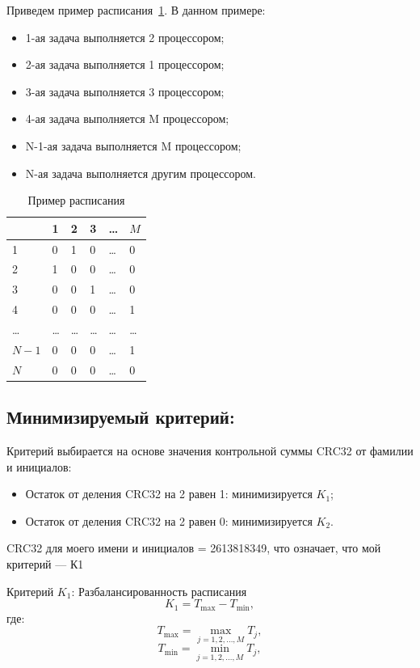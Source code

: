\documentclass[openany, twoside, a4paper, 12pt]{extbook}
\begin{document}
	Приведем пример расписания~\ref{rasp}. 
	В данном примере:
	\begin{itemize}
		\item 1-ая задача выполняется 2 процессором; 
		\item 2-ая задача выполняется 1 процессором;
		\item 3-ая задача выполняется 3 процессором;
		\item 4-ая задача выполняется M процессором;
		\item N-1-ая задача выполняется M процессором;
		\item N-ая задача выполняется другим процессором.
	\end{itemize}
	\begin{table}
			\begin{tabular}{|p{1.8cm}|p{1.8cm}|p{1.8cm}|p{1.8cm}|p{1.8cm}|p{1.8cm}|} 
		\hline
		& 1 & 2 & 3 & \ldots & $ M $ \\ 
		\hline
			1 & 0 & 1 & 0 & \ldots & 0 \\ 
		\hline
			2 & 1 & 0 & 0 & \ldots & 0 \\ 
		\hline
			3 & 0 & 0 & 1 & \ldots & 0 \\ 
		\hline
			4 & 0 & 0 & 0 & \ldots & 1 \\ 
		\hline
			\ldots & \ldots  & \ldots  & \ldots  & \ldots & \ldots  \\ 	
		\hline
			$N-1$ & 0 & 0 & 0 & \ldots & 1 \\ 
		\hline
			$N$ & 0 & 0 & 0 & \ldots & 0\\ 
		\hline
	\end{tabular}
		\caption{Пример расписания}
		\label{rasp}
	\end{table}

	\subsection*{Минимизируемый критерий:}
		
	Критерий выбирается на основе значения контрольной суммы CRC32 от фамилии и инициалов:
	\begin{itemize}
		\label{cr1}
	    \item Остаток от деления CRC32 на 2 равен 1: минимизируется \( K_1 \);
	    \item Остаток от деления CRC32 на 2 равен 0: минимизируется \( K_2 \).
	\end{itemize}
	CRC32 для моего имени и инициалов = 2613818349, что означает, что мой критерий --- К1
	

	Критерий \( K_1 \): Разбалансированность расписания
	\[
	K_1 = T_{\text{max}} - T_{\text{min}},
	\]
	где:
	\[
	T_{\text{max}} = \max_{j=1, 2, \dots, M} T_j,
	\]
	\[
	T_{\text{min}} = \min_{j=1, 2, \dots, M} T_j,
	\]
\end{document}
